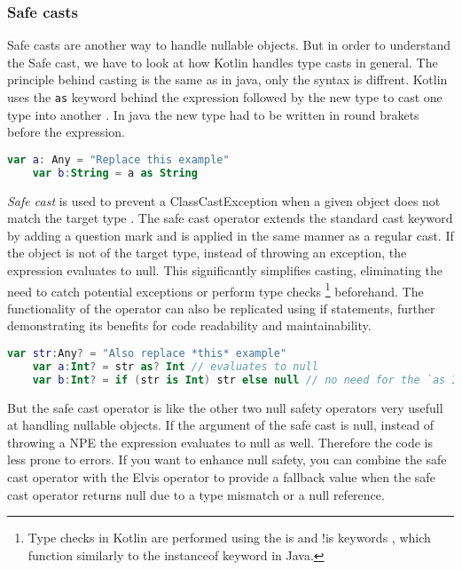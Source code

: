 \documentclass[a4paper, 11pt]{article}
\begin{document}
\subsubsection{Safe casts}
  Safe casts are another way to handle nullable objects. But in order to understand the Safe cast, we have to look at how Kotlin handles type casts in general. The principle behind casting is the same as in java, only the syntax is diffrent. Kotlin uses the \texttt{as} keyword behind the expression followed by the new type to cast one type into another \cite{casting}. In java the new type had to be written in round brakets before the expression.
  \begin{lstlisting}[language=Kotlin,title={Casting in Kotlin}]
    var a: Any = "Replace this example"
    var b:String = a as String
  \end{lstlisting} %
  \textit{Safe cast} is used to prevent a ClassCastException when a given object does not match the target type \cite{nullsafety-safe-cast}. The safe cast operator extends the standard cast keyword by adding a question mark and is applied in the same manner as a regular cast. If the object is not of the target type, instead of throwing an exception, the expression evaluates to null. This significantly simplifies casting, eliminating the need to catch potential exceptions or perform type checks \footnote{Type checks in Kotlin are performed using the is and !is keywords \cite{casting-is-operator}, which function similarly to the instanceof keyword in Java.} beforehand. The functionality of the operator can also be replicated using if statements, further demonstrating its benefits for code readability and maintainability.
  \begin{lstlisting}[language=Kotlin,title={Usage of the safe cast operator in comparisopn to an if statement}]
    var str:Any? = "Also replace *this* example"
    var a:Int? = str as? Int // evaluates to null
    var b:Int? = if (str is Int) str else null // no need for the `as Int` here due to smart casting
  \end{lstlisting}
  But the safe cast operator is like the other two null safety operators very usefull at handling nullable objects. If the argument of the safe cast is null, instead of throwing a NPE the expression evaluates to null as well. Therefore the code is less prone to errors. If you want to enhance null safety, you can combine the safe cast operator with the Elvis operator to provide a fallback value when the safe cast operator returns null due to a type mismatch or a null reference.
\end{document}
